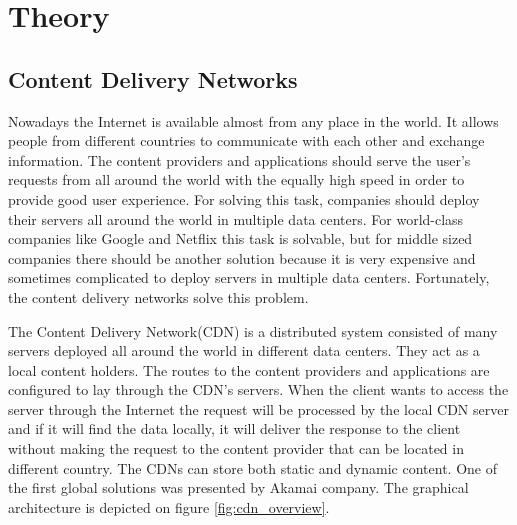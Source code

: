 \section{Theory}
	
\subsection{Content Delivery Networks}


Nowadays the Internet is available almost from any place in the world. It allows people from different countries to communicate with each other and exchange information. The content providers and applications should serve the user's requests from all around the world with the equally high speed in order to provide good user experience. For solving this task, companies should deploy their servers all around the world in multiple data centers. For world-class companies like Google and Netflix this task is solvable\cite{NetflixCDN}, but for middle sized companies there should be another solution because it is very expensive and sometimes complicated to deploy servers in multiple data centers. Fortunately, the content delivery networks solve this problem\cite{AkamaiCDN}.

The Content Delivery Network(CDN) is a distributed system consisted of many servers deployed all around the world in different data centers. They act as a local content holders. The routes to the content providers and applications are configured to lay through the CDN's servers. When the client wants to access the server through the Internet the request will be processed by the local CDN server and if it will find the data locally, it will deliver the response to the client without making the request to the content provider that can be located in different country. The CDNs can store both static and dynamic content. One of the first global solutions was presented by Akamai company\cite{AkamaiCDN}. The graphical architecture is depicted on figure \ref{fig:cdn_overview}.

